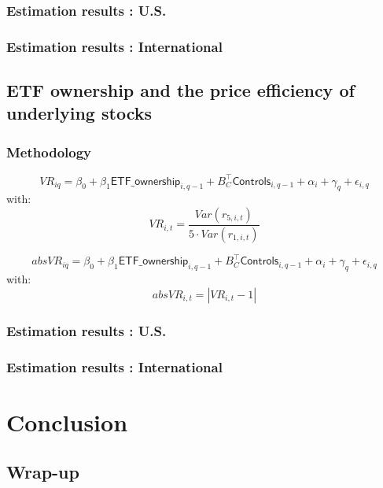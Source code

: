 \documentclass[9pt, usenames, dvipsnames]{beamer}
\begin{document}
\begin{frame}
  \frametitle{Estimation results : U.S.}
  \centering
  
\end{frame}

\begin{frame}
  \frametitle{Estimation results : International}
  \centering
  
\end{frame}


\subsection{ETF ownership and the price efficiency of underlying stocks}
\begin{frame}
  \frametitle{Methodology}
  
\begin{equation}
  VR_{iq} = \beta_{0} + \beta_{1} \mathsf{ETF\_ownership}_{i, q - 1} + B_{C}^{\intercal} \mathsf{Controls}_{i, q - 1} + \alpha_{i} + \gamma_{q} + \epsilon_{i, q}
\end{equation}
with:
\begin{equation*}
 VR_{i,t} = \frac{\mathit{Var}(r_{5,i,t})}{5 \cdot \mathit{Var}(r_{1, i,t})}
\end{equation*}


\begin{equation}
 absVR_{iq} = \beta_{0} + \beta_{1} \mathsf{ETF\_ownership}_{i, q - 1} + B_{C}^{\intercal} \mathsf{Controls}_{i, q - 1} + \alpha_{i} + \gamma_{q} + \epsilon_{i, q}
\end{equation}
with:
\begin{equation*}
absVR_{i,t} = \left\lvert VR_{i, t}  - 1\right\rvert  
\end{equation*}
\end{frame}

\begin{frame}
  \frametitle{Estimation results : U.S.}
  \centering
  
\end{frame}

\begin{frame}
  \frametitle{Estimation results : International}
  \centering
  
\end{frame}

\section{Conclusion}
\subsection{Wrap-up}
\end{document}
